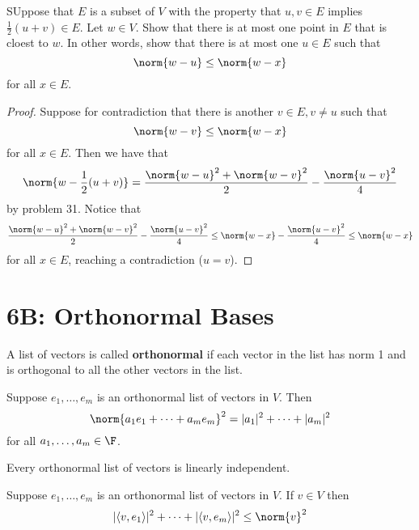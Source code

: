 \documentclass{extarticle}
\begin{document}
\begin{problem}{32}
    SUppose that \(E\) is a subset of \(V\) with the property that \(u, v \in E\) implies
    \(\frac{1}{2}(u+v) \in E\). Let \(w \in V\). Show that there is at most one point in \(E\)
    that is cloest to \(w\). In other words, show that there is at most one \(u \in E\) such that
    \[\norm{w - u} \leq \norm{w - x}\]
    for all \(x \in E\).
\end{problem}

\begin{proof}
Suppose for contradiction that there is another \(v \in E, v \neq u\) such that
\[\norm{w - v} \leq \norm{w - x}\]
for all \(x \in E\). Then we have that
\[\norm{w - \frac{1}{2}(u+v)} = \frac{\norm{w - u}^2 + \norm{w - v}^2}{2} - \frac{\norm{u-v}^2}{4}\]
by problem 31. Notice that
\[\frac{\norm{w - u}^2 + \norm{w - v}^2}{2} - \frac{\norm{u-v}^2}{4} \leq \norm{w - x} -
\frac{\norm{u-v}^2}{4} \leq \norm{w - x}\]
for all \(x \in E\), reaching a contradiction (\(u = v\)).
\end{proof}


\newpage
\section*{6B: Orthonormal Bases}

\begin{definition}[orthonormal]
    A list of vectors is called \textbf{orthonormal} if each vector in the list has norm 1 and
    is orthogonal to all the other vectors in the list.
\end{definition}

\begin{corollary}
    Suppose \(e_1, \ldots, e_m\) is an orthonormal list of vectors in \(V\). Then
    \[\norm{a_1 e_1 + \cdots + a_m e_m}^2 = |a_1|^2 + \cdots + |a_m|^2\]
    for all \(a_1, \ldots, a_m \in \F\).
\end{corollary}

\begin{corollary}
    Every orthonormal list of vectors is linearly independent.
\end{corollary}

\begin{thm}
    Suppose \(e_1, \ldots, e_m\) is an orthonormal list of vectors in \(V\). If \(v \in V\) then
    \[ |\langle v,e_1 \rangle|^2 + \cdots + |\langle v,e_m \rangle|^2 \leq \norm{v}^2\]
\end{thm}
\end{document}
